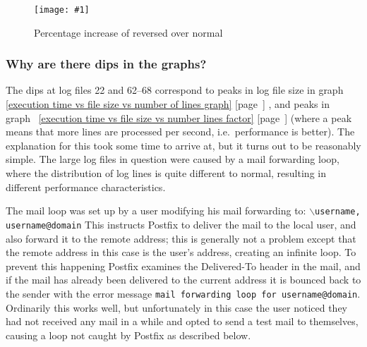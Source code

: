 \documentclass[a4paper,12pt,draft]{article}
\newcommand{\showgraph}[3]{
    \begin{figure}[hbt!]
        \caption{#2}\label{#3}
        \texttt{[image: \#1]}
    \end{figure}
}
\newcommand{\refwithpage}[1]{%
    \empty{}\ref{#1} [page~\pageref{#1}]%
}
\newcommand{\tab}[0]{%
    \hspace*{2em}%
}
\begin{document}
\showgraph{build/plot-normal-reverse-factor}{Percentage increase of
reversed over normal}{percentage increase of reversed over normal}

\subsubsection{Why are there dips in the graphs?}
\label{Why are there dips in the graphs?}

The dips at log files 22 and 62--68 correspond to peaks in log file size in
graph~\refwithpage{execution time vs file size vs number of lines graph},
and peaks in graph~\refwithpage{execution time vs file size vs number lines
factor} (where a peak means that more lines are processed per second, i.e.\
performance is better).  The explanation for this took some time to arrive
at, but it turns out to be reasonably simple.  The large log files in
question were caused by a mail forwarding loop, where the distribution of
log lines is quite different to normal, resulting in different performance
characteristics.

The mail loop was set up by a user modifying his mail forwarding to:
\newline \tab{}\texttt{$\backslash$username, username@domain} \newline This
instructs Postfix to deliver the mail to the local user, and also forward
it to the remote address; this is generally not a problem except that the
remote address in this case is the user's address, creating an infinite
loop.  To prevent this happening Postfix examines the Delivered-To header
in the mail, and if the mail has already been delivered to the current
address it is bounced back to the sender with the error message
\texttt{mail forwarding loop for username@domain}.  Ordinarily this works
well, but unfortunately in this case the user noticed they had not received
any mail in a while and opted to send a test mail to themselves, causing a
loop not caught by Postfix as described below.
\end{document}

